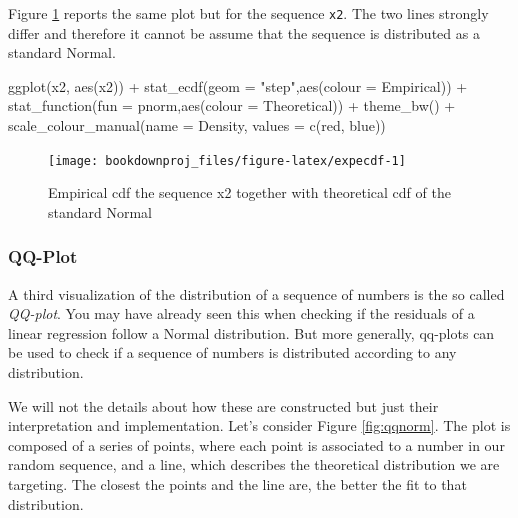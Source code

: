 \documentclass[
]{book}
\newenvironment{Shaded}{\begin{snugshade}}{\end{snugshade}}
\newcommand{\AttributeTok}[1]{\textcolor[rgb]{0.77,0.63,0.00}{#1}}
\newcommand{\FunctionTok}[1]{\textcolor[rgb]{0.00,0.00,0.00}{#1}}
\newcommand{\NormalTok}[1]{#1}
\newcommand{\SpecialCharTok}[1]{\textcolor[rgb]{0.00,0.00,0.00}{#1}}
\newcommand{\StringTok}[1]{\textcolor[rgb]{0.31,0.60,0.02}{#1}}
\theoremstyle{definition}
\theoremstyle{definition}
\theoremstyle{definition}
\theoremstyle{definition}
\theoremstyle{remark}
\begin{document}
Figure \ref{fig:expecdf} reports the same plot but for the sequence \texttt{x2}. The two lines strongly differ and therefore it cannot be assume that the sequence is distributed as a standard Normal.

\begin{Shaded}
\begin{Highlighting}[]
\FunctionTok{ggplot}\NormalTok{(x2, }\FunctionTok{aes}\NormalTok{(x2)) }\SpecialCharTok{+}
   \FunctionTok{stat\_ecdf}\NormalTok{(}\AttributeTok{geom =} \StringTok{"step"}\NormalTok{,}\FunctionTok{aes}\NormalTok{(}\AttributeTok{colour =} \StringTok{\textquotesingle{}Empirical\textquotesingle{}}\NormalTok{)) }\SpecialCharTok{+}
   \FunctionTok{stat\_function}\NormalTok{(}\AttributeTok{fun =}\NormalTok{ pnorm,}\FunctionTok{aes}\NormalTok{(}\AttributeTok{colour =} \StringTok{\textquotesingle{}Theoretical\textquotesingle{}}\NormalTok{)) }\SpecialCharTok{+}
   \FunctionTok{theme\_bw}\NormalTok{() }\SpecialCharTok{+}      
   \FunctionTok{scale\_colour\_manual}\NormalTok{(}\AttributeTok{name =} \StringTok{\textquotesingle{}Density\textquotesingle{}}\NormalTok{, }\AttributeTok{values =} \FunctionTok{c}\NormalTok{(}\StringTok{\textquotesingle{}red\textquotesingle{}}\NormalTok{, }\StringTok{\textquotesingle{}blue\textquotesingle{}}\NormalTok{))}
\end{Highlighting}
\end{Shaded}

\begin{figure}

{\centering \texttt{[image: bookdownproj\_files/figure-latex/expecdf-1]} 

}

\caption{Empirical cdf the sequence x2 together with theoretical cdf of the standard Normal}\label{fig:expecdf}
\end{figure}

\hypertarget{qq-plot}{%
\subsubsection{QQ-Plot}\label{qq-plot}}

A third visualization of the distribution of a sequence of numbers is the so called \emph{QQ-plot}. You may have already seen this when checking if the residuals of a linear regression follow a Normal distribution. But more generally, qq-plots can be used to check if a sequence of numbers is distributed according to any distribution.

We will not the details about how these are constructed but just their interpretation and implementation. Let's consider Figure \ref{fig:qqnorm}. The plot is composed of a series of points, where each point is associated to a number in our random sequence, and a line, which describes the theoretical distribution we are targeting. The closest the points and the line are, the better the fit to that distribution.
\end{document}
